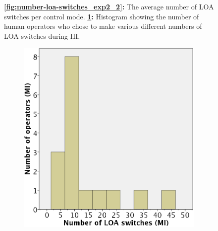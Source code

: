 \documentclass[a4paper,12pt,oneside,openright]{bhamthesis}
\begin{document}
\begin{figure}
\begin{subfigure}[b]{0.45\textwidth}
			\caption{}
			\label{subfig:histogram_lao_hi_exp2_2}
		\end{subfigure}
		\hfill
		\caption{\textbf{\ref{fig:number-loa-switches_exp2_2}:} The average number of LOA switches per control mode. \textbf{\ref{subfig:histogram_lao_hi_exp2_2}:} Histogram showing the number of human operators who chose to make various different numbers of LOA switches during HI.}
		\label{fig:loa_histogram_exp2_2}
	\end{figure}

	\begin{figure}
		\centering
		\begin{subfigure}[b]{0.45\textwidth}
			\centering
			\includegraphics[width=\textwidth]{chapter5_fig/histogram_loa_mi_exp2_2.png}
			\caption{}
			\label{subfig:histogram_lao_mi_exp2_2}
		\end{subfigure}
		\hfill
		\begin{subfigure}[b]{0.45\textwidth}
			\centering

\end{subfigure}
\end{figure}
\end{document}
